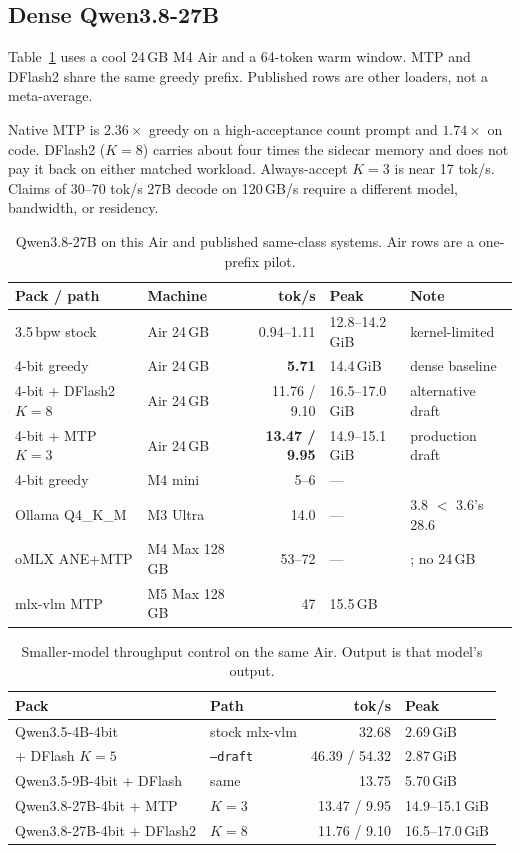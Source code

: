 \subsection{Dense Qwen3.8-27B}
\label{sec:eval-27b}

Table~\ref{tab:27b} uses a cool 24\,GB M4 Air and a 64-token warm window. MTP and DFlash2 share the same greedy prefix. Published rows are other loaders, not a meta-average.

Native MTP is $2.36{\times}$ greedy on a high-acceptance count prompt and $1.74{\times}$ on code. DFlash2 ($K{=}8$) carries about four times the sidecar memory and does not pay it back on either matched workload. Always-accept $K{=}3$ is near 17 tok/s. Claims of 30--70 tok/s 27B decode on 120\,GB/s require a different model, bandwidth, or residency.

\begin{table}[t]
\centering
\caption{Qwen3.8-27B on this Air and published same-class systems. Air rows are a one-prefix pilot.}
\label{tab:27b}
\scriptsize
\begin{tabular}{@{}llrll@{}}
\toprule
Pack / path & Machine & tok/s & Peak & Note \\
\midrule
3.5\,bpw stock & Air 24\,GB & 0.94--1.11 & 12.8--14.2\,GiB & kernel-limited \\
4-bit greedy & Air 24\,GB & \textbf{5.71} & 14.4\,GiB & dense baseline \\
4-bit + DFlash2 $K{=}8$ & Air 24\,GB & 11.76 / 9.10 & 16.5--17.0\,GiB & alternative draft \\
4-bit + MTP $K{=}3$ & Air 24\,GB & \textbf{13.47 / 9.95} & 14.9--15.1\,GiB & production draft \\
4-bit greedy & M4 mini & 5--6 & --- & \citet{orcarouter2026} \\
Ollama Q4\_K\_M & M3 Ultra & 14.0 & --- & 3.8 $<$ 3.6's 28.6~\citep{terminalbytes2026} \\
oMLX ANE+MTP & M4 Max 128\,GB & 53--72 & --- & \citet{weschera2026}; no 24\,GB \\
mlx-vlm MTP & M5 Max 128\,GB & 47 & 15.5\,GB & \citet{nathanmaine} \\
\bottomrule
\end{tabular}
\end{table}

\begin{table}[t]
\centering
\caption{Smaller-model throughput control on the same Air. Output is that model’s output.}
\label{tab:4b}
\small
\begin{tabular}{@{}llrl@{}}
\toprule
Pack & Path & tok/s & Peak \\
\midrule
Qwen3.5-4B-4bit & stock mlx-vlm & 32.68 & 2.69\,GiB \\
+ DFlash $K{=}5$ & \texttt{--draft} & 46.39 / 54.32 & 2.87\,GiB \\
Qwen3.5-9B-4bit + DFlash & same & 13.75 & 5.70\,GiB \\
Qwen3.8-27B-4bit + MTP & $K{=}3$ & 13.47 / 9.95 & 14.9--15.1\,GiB \\
Qwen3.8-27B-4bit + DFlash2 & $K{=}8$ & 11.76 / 9.10 & 16.5--17.0\,GiB \\
\bottomrule
\end{tabular}
\end{table}

